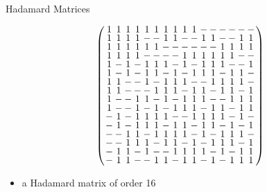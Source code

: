 \documentclass{beamer}
\begin{document}
\begin{frame}{Hadamard Matrices}

  \[
    \arraycolsep=1.0pt\def\arraystretch{0.75}
    \left(\begin{array}{cccccccccccccccc}
            1&1&1&1&1&1&1&1&1&1&-&-&-&-&-&-\\
            1&1&1&1&-&-&1&1&-&-&1&1&-&-&1&1\\
            1&1&1&1&1&1&-&-&-&-&-&-&1&1&1&1\\
            1&1&1&1&-&-&-&-&1&1&1&1&1&1&-&-\\
            1&-&1&-&1&1&1&-&1&-&1&1&1&-&-&1\\
            1&-&1&-&1&1&-&1&-&1&1&1&-&1&1&-\\
            1&1&-&-&1&-&1&1&1&-&-&1&1&1&1&-\\
            1&1&-&-&-&1&1&1&-&1&1&-&1&1&-&1\\
            1&-&-&1&1&-&1&-&1&1&1&-&-&1&1&1\\
            1&-&-&1&-&1&-&1&1&1&-&1&1&-&1&1\\
            -&1&-&1&1&1&1&-&-&1&1&1&1&-&1&-\\
            -&1&-&1&1&1&-&1&1&-&1&1&-&1&-&1\\
            -&-&1&1&-&1&1&1&1&-&1&-&1&1&1&-\\
            -&-&1&1&1&-&1&1&-&1&-&1&1&1&-&1\\
            -&1&1&-&1&-&-&1&1&1&1&-&1&-&1&1\\
            -&1&1&-&-&1&1&-&1&1&-&1&-&1&1&1\\
          \end{array}\right)
      \]

      \begin{itemize}
      \item a Hadamard matrix of order 16
      \end{itemize}

\end{frame}
\end{document}
